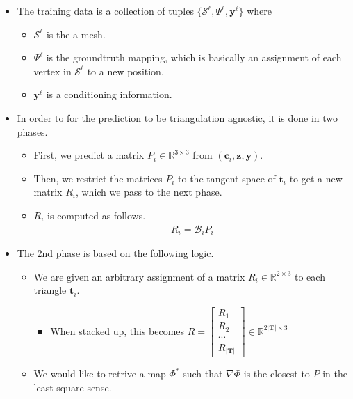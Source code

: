 \documentclass[10pt]{article}
\newcommand{\ve}[1]{\mathbf{#1}}
\newcommand{\mcal}[1]{\mathcal{#1}}
\newcommand{\Real}{\mathbb{R}}
\begin{document}
\begin{itemize}
    \item The training data is a collection of tuples $\{ \mcal{S}^\ell, \Psi^\ell, \ve{y}^\ell \}$ where
    \begin{itemize}
        \item $\mcal{S}^\ell$ is the a mesh.
        \item $\Psi^\ell$ is the groundtruth mapping, which is basically an assignment of each vertex in $\mcal{S}^\ell$ to a new position.
        \item $\ve{y}^\ell$ is a conditioning information.
    \end{itemize}

    \item In order to for the prediction to be triangulation agnostic, it is done in two phases.
    \begin{itemize}
        \item First, we predict a matrix $P_i \in \Real^{3 \times 3}$ from $(\ve{c}_i, \ve{z}, \ve{y})$.
        \item Then, we restrict the matrices $P_i$ to the tangent space of $\ve{t}_i$ to get a new matrix $R_i$, which we pass to the next phase.
        \item $R_i$ is computed as follows.
        \begin{align*}
            R_i = \mathcal{B}_i P_i
        \end{align*}
    \end{itemize}

    \item The 2nd phase is based on the following logic.
    \begin{itemize}
        \item We are given an arbitrary assignment of a matrix $R_i \in \Real^{2 \times 3}$ to each triangle $\ve{t}_i$.
        \begin{itemize}
            \item When stacked up, this becomes $R = \begin{bmatrix}
                R_1 \\ R_2 \\ \cdots \\ R_{|\ve{T}|}
            \end{bmatrix} \in \Real^{2|\ve{T}| \times 3}$
        \end{itemize}
        
        \item We would like to retrive a map $\Phi^*$ such that $\nabla \Phi$ is the closest to $P$ in the least square sense.
        

\end{itemize}
\end{itemize}
\end{document}
